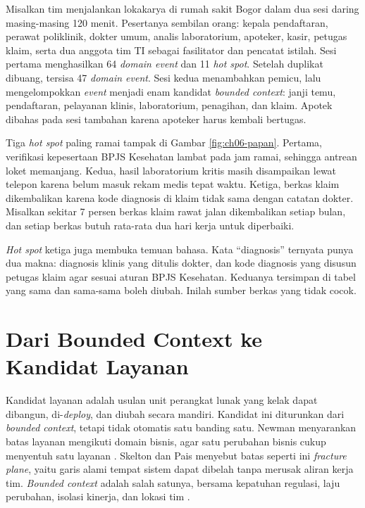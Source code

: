 \begin{kasus}[title={Kasus Medikara Health: Dari Pendaftaran Rawat Jalan sampai Klaim BPJS}]
  Misalkan tim menjalankan lokakarya di rumah sakit Bogor dalam dua sesi daring masing-masing 120
  menit. Pesertanya sembilan orang: kepala pendaftaran, perawat poliklinik, dokter umum, analis
  laboratorium, apoteker, kasir, petugas klaim, serta dua anggota tim TI sebagai fasilitator dan
  pencatat istilah. Sesi pertama menghasilkan 64 \textit{domain event} dan 11 \textit{hot spot}.
  Setelah duplikat dibuang, tersisa 47 \textit{domain event}. Sesi kedua menambahkan pemicu, lalu
  mengelompokkan \textit{event} menjadi enam kandidat \textit{bounded context}: janji temu,
  pendaftaran, pelayanan klinis, laboratorium, penagihan, dan klaim. Apotek dibahas pada sesi
  tambahan karena apoteker harus kembali bertugas.

  Tiga \textit{hot spot} paling ramai tampak di Gambar \ref{fig:ch06-papan}. Pertama, verifikasi
  kepesertaan BPJS Kesehatan lambat pada jam ramai, sehingga antrean loket memanjang. Kedua, hasil
  laboratorium kritis masih disampaikan lewat telepon karena belum masuk rekam medis tepat waktu.
  Ketiga, berkas klaim dikembalikan karena kode diagnosis di klaim tidak sama dengan catatan dokter.
  Misalkan sekitar 7 persen berkas klaim rawat jalan dikembalikan setiap bulan, dan setiap berkas
  butuh rata-rata dua hari kerja untuk diperbaiki.

  \textit{Hot spot} ketiga juga membuka temuan bahasa. Kata ``diagnosis'' ternyata punya dua makna:
  diagnosis klinis yang ditulis dokter, dan kode diagnosis yang disusun petugas klaim agar sesuai
  aturan BPJS Kesehatan. Keduanya tersimpan di tabel yang sama dan sama-sama boleh diubah. Inilah
  sumber berkas yang tidak cocok.
\end{kasus}

\section{Dari Bounded Context ke Kandidat Layanan}
\label{sec:ch06-kandidat-layanan}

Kandidat layanan adalah usulan unit perangkat lunak yang kelak dapat dibangun, di-\textit{deploy},
dan diubah secara mandiri. Kandidat ini diturunkan dari \textit{bounded context}, tetapi tidak
otomatis satu banding satu. Newman menyarankan batas layanan mengikuti domain bisnis, agar satu
perubahan bisnis cukup menyentuh satu layanan \cite{newman2021}. Skelton dan Pais menyebut batas
seperti ini \textit{fracture plane}, yaitu garis alami tempat sistem dapat dibelah tanpa merusak
aliran kerja tim. \textit{Bounded context} adalah salah satunya, bersama kepatuhan regulasi, laju
perubahan, isolasi kinerja, dan lokasi tim \cite{skelton2025}.

